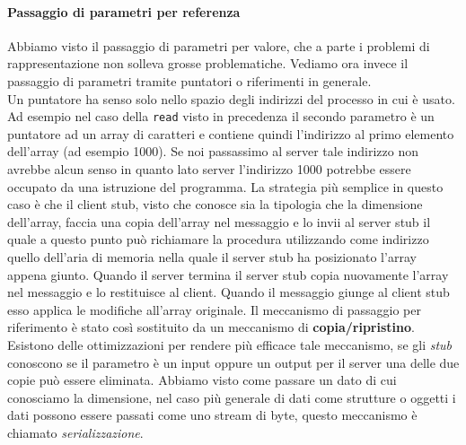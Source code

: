 \paragraph{Passaggio di parametri per referenza}
Abbiamo visto il passaggio di parametri per valore, che a parte i problemi di rappresentazione non solleva grosse problematiche. Vediamo ora invece il passaggio di parametri tramite puntatori o riferimenti in generale.\\
Un puntatore ha senso solo nello spazio degli indirizzi del processo in cui è usato. Ad esempio nel  caso della \texttt{read} visto in precedenza il secondo parametro è un puntatore ad un array di caratteri e contiene quindi l'indirizzo al primo elemento dell'array (ad esempio 1000). Se noi passassimo al server tale indirizzo non avrebbe alcun senso in quanto lato server l'indirizzo 1000 potrebbe essere occupato da una istruzione del programma.
La strategia più semplice in questo caso è che il client stub, visto che conosce sia la tipologia che la dimensione dell'array, faccia una copia dell'array nel messaggio e lo invii al server stub il quale a questo punto può richiamare la procedura utilizzando come indirizzo quello dell'aria di memoria nella quale il server stub ha posizionato l'array appena giunto. Quando il server termina il server stub copia nuovamente l'array nel messaggio e lo restituisce al client. Quando il messaggio giunge al client stub esso applica le modifiche all'array originale. Il meccanismo di passaggio per riferimento è stato così sostituito da un meccanismo di \textbf{copia/ripristino}.\\
Esistono delle ottimizzazioni per rendere più efficace tale meccanismo, se gli \emph{stub} conoscono se il parametro è un input oppure un output per il server una delle due copie può essere eliminata.
Abbiamo visto come passare un dato di cui conosciamo la dimensione, nel caso più generale di dati come strutture o oggetti i dati possono essere passati come uno stream di byte, questo meccanismo è chiamato \emph{serializzazione}.
